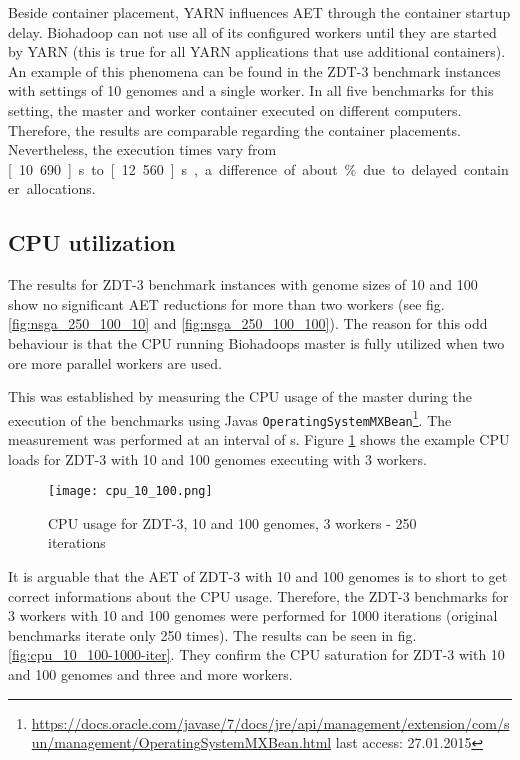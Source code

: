 Beside container placement, YARN influences AET through the container startup delay. Biohadoop can not use all of its configured workers until they are started by YARN (this is true for all YARN applications that use additional containers). An example of this phenomena can be found in the ZDT-3 benchmark instances with settings of 10 genomes and a single worker. In all five benchmarks for this setting, the master and worker container executed on different computers. Therefore, the results are comparable regarding the container placements. Nevertheless, the execution times vary from \unit[10.690]{s} to \unit[12.560]{s}, a difference of about \unit[15]{\%} due to delayed container allocations.

\subsection{CPU utilization}
\label{chap:evaluation:influence-cpu}
The results for ZDT-3 benchmark instances with genome sizes of 10 and 100 show no significant AET reductions for more than two workers (see fig. \ref{fig:nsga_250_100_10} and \ref{fig:nsga_250_100_100}). The reason for this odd behaviour is that the CPU running Biohadoops master is fully utilized when two ore more parallel workers are used.

This was established by measuring the CPU usage of the master during the execution of the benchmarks using Javas \texttt{OperatingSystemMXBean}\footnote{\url{https://docs.oracle.com/javase/7/docs/jre/api/management/extension/com/sun/management/OperatingSystemMXBean.html} last access: 27.01.2015}. The measurement was performed at an interval of \unit[1]{s}. Figure \ref{fig:cpu_10_100} shows the example CPU loads for ZDT-3 with 10 and 100 genomes executing with 3 workers.

\begin{figure}
  \centering
  \texttt{[image: cpu\_10\_100.png]}
  \caption[CPU usage for ZDT-3, 10 and 100 genomes, 3 workers]{CPU usage for ZDT-3, 10 and 100 genomes, 3 workers - 250 iterations}
  \label{fig:cpu_10_100}
\end{figure}

It is arguable that the AET of ZDT-3 with 10 and 100 genomes is to short to get correct informations about the CPU usage. Therefore, the ZDT-3 benchmarks for 3 workers with 10 and 100 genomes were performed for 1000 iterations (original benchmarks iterate only 250 times). The results can be seen in fig. \ref{fig:cpu_10_100-1000-iter}. They confirm the CPU saturation for ZDT-3 with 10 and 100 genomes and three and more workers.

